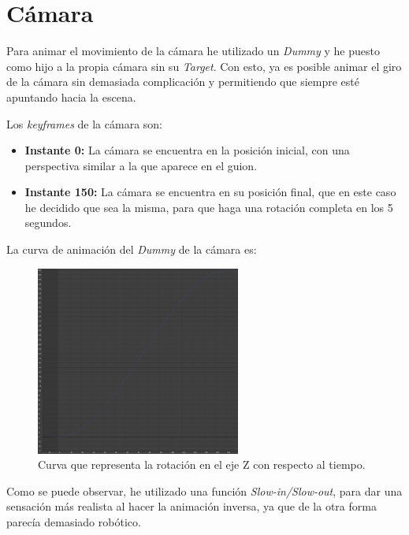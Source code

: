 \section{Cámara}
Para animar el movimiento de la cámara he utilizado un \textit{Dummy} y he puesto como hijo a la propia cámara sin su \textit{Target}. Con esto, ya es posible animar el giro de la cámara sin demasiada complicación y permitiendo que siempre esté apuntando hacia la escena.

\bigskip

Los \textit{keyframes} de la cámara son:

\begin{itemize}
    \item \textbf{Instante 0: }La cámara se encuentra en la posición inicial, con una perspectiva similar a la que aparece en el guion.
    \item \textbf{Instante 150: }La cámara se encuentra en su posición final, que en este caso he decidido que sea la misma, para que haga una rotación completa en los 5 segundos.
\end{itemize}

\bigskip

La curva de animación del \textit{Dummy} de la cámara es:

\begin{figure}[H]
    \centering
    \includegraphics[width=0.6\textwidth]{imagenes/curvas/Camara/blue.png}
    \caption{Curva que representa la rotación en el eje Z con respecto al tiempo.}
 \end{figure}

Como se puede observar, he utilizado una función \textit{Slow-in/Slow-out}, para dar una sensación más realista al hacer la animación inversa, ya que de la otra forma parecía demasiado robótico.

\newpage

